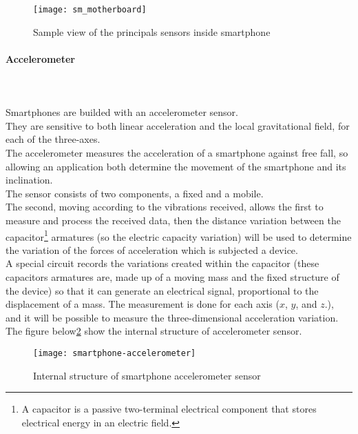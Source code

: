 \documentclass{standalone}
\begin{document}
\vspace{1cm}
\begin{figure}[ht]
\centering
\texttt{[image: sm\_motherboard]}
\caption{Sample view of the principals sensors inside smartphone}
\label{fig:Sample smartphone sensors}
\end{figure}


\paragraph{{\Large Accelerometer}}\leavevmode\\\\
Smartphones are builded with an accelerometer sensor.\\
They are sensitive to both linear acceleration and the local gravitational field, for each of the three-axes.\\ The accelerometer measures the acceleration of a smartphone against free fall, so allowing an application both determine the movement of the smartphone and its inclination.\\
The sensor consists of two components, a fixed and a mobile.\\
The second, moving according to the vibrations received, allows the first to measure and process the received data, then the distance variation between the capacitor\footnote{A capacitor is a passive two-terminal electrical component that stores electrical energy in an electric field.} armatures (so the electric capacity variation) will be used to determine the variation of the forces of acceleration which is subjected a device.\\ A special circuit records the variations created within the capacitor (these capacitors armatures are, made up of a moving mass and the fixed structure of the device) so that it can generate an electrical signal, proportional to the displacement of a mass.
The measurement is done for each axis ($x$, $y$, and $z$.), and it will be possible to measure the three-dimensional acceleration variation.\\The figure below\ref{fig:Sample smartphone accelerometer sensors} show the internal structure of accelerometer sensor.
\vspace{1cm}
\begin{figure}[h]
\centering
\texttt{[image: smartphone-accelerometer]}
\caption{Internal structure of smartphone accelerometer sensor}
\label{fig:Sample smartphone accelerometer sensors}
\end{figure}
\clearpage
\end{document}
